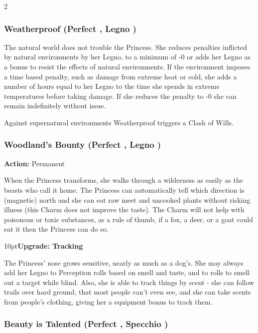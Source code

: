 \begin{multicols}{2}
\subsubsection*{Weatherproof (Perfect \textbullet, Legno \textbullet)}

The natural world does not trouble the Princess. She reduces penalties inflicted by natural environments by her Legno, to a minimum of -0 or adds her Legno as a bonus to resist the effects of natural environments. If the environment imposes a time based penalty, such as damage from extreme heat or cold, she adds a number of hours equal to her Legno to the time she spends in extreme temperatures before taking damage. If she reduces the penalty to -0 she can remain indefinitely without issue. 

Against supernatural environments Weatherproof triggers a Clash of Wills.

\subsubsection*{Woodland's Bounty (Perfect \textbullet, Legno \textbullet)}

\noindent \textbf{Action:} Permanent

When the Princess transforms, she walks through a wilderness as easily as the beasts who call it home. The Princess can automatically tell which direction is (magnetic) north and she can eat raw meet and uncooked plants without risking illness (this Charm does not improve the taste). The Charm will not help with poisonous or toxic substances, as a rule of thumb, if a fox, a deer, or a goat could eat it then the Princess can do so. 

\begin{myindentpar}{10pt}\textbf{Upgrade: Tracking}

The Princess' nose grows sensitive, nearly as much as a dog's. She may always add her Legno to Perception rolls based on smell and taste, and to rolls to smell out a target while blind. Also, she is able to track things by scent - she can follow trails over hard ground, that most people can't even see, and she can take scents from people's clothing, giving her a equipment bonus to track them.\end{myindentpar}

\subsubsection*{Beauty is Talented (Perfect \textbullet, Specchio \textbullet)}


\end{multicols}
